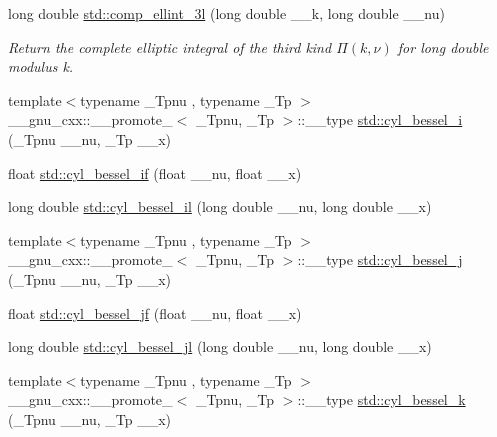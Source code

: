 \begin{DoxyCompactItemize}
long double \hyperlink{group__tr29124__math__spec__func_ga1ca081fee102cd0d4d6b091285e495e5}{std\+::comp\+\_\+ellint\+\_\+3l} (long double \+\_\+\+\_\+k, long double \+\_\+\+\_\+nu)
\begin{DoxyCompactList}\small\item\em Return the complete elliptic integral of the third kind $ \Pi(k,\nu) $ for {\ttfamily long double} modulus {\ttfamily k}. \end{DoxyCompactList}\item 
{\footnotesize template$<$typename \+\_\+\+Tpnu , typename \+\_\+\+Tp $>$ }\\\+\_\+\+\_\+gnu\+\_\+cxx\+::\+\_\+\+\_\+promote\+\_$<$ \+\_\+\+Tpnu, \+\_\+\+Tp $>$\+::\+\_\+\+\_\+type \hyperlink{group__tr29124__math__spec__func_ga1c9b5a5c36f000a4f0a55f7fcc486cb0}{std\+::cyl\+\_\+bessel\+\_\+i} (\+\_\+\+Tpnu \+\_\+\+\_\+nu, \+\_\+\+Tp \+\_\+\+\_\+x)
\item 
float \hyperlink{group__tr29124__math__spec__func_gaaf738427d4da0bda66bc2274dfb853a7}{std\+::cyl\+\_\+bessel\+\_\+if} (float \+\_\+\+\_\+nu, float \+\_\+\+\_\+x)
\item 
long double \hyperlink{group__tr29124__math__spec__func_gab7962629216d03efb8ecaa3f70c6878f}{std\+::cyl\+\_\+bessel\+\_\+il} (long double \+\_\+\+\_\+nu, long double \+\_\+\+\_\+x)
\item 
{\footnotesize template$<$typename \+\_\+\+Tpnu , typename \+\_\+\+Tp $>$ }\\\+\_\+\+\_\+gnu\+\_\+cxx\+::\+\_\+\+\_\+promote\+\_$<$ \+\_\+\+Tpnu, \+\_\+\+Tp $>$\+::\+\_\+\+\_\+type \hyperlink{group__tr29124__math__spec__func_ga47e21a13b6d68d0d7f057699bd3b3ce0}{std\+::cyl\+\_\+bessel\+\_\+j} (\+\_\+\+Tpnu \+\_\+\+\_\+nu, \+\_\+\+Tp \+\_\+\+\_\+x)
\item 
float \hyperlink{group__tr29124__math__spec__func_ga15731a7bccd6351d28353e3c4c2a2d23}{std\+::cyl\+\_\+bessel\+\_\+jf} (float \+\_\+\+\_\+nu, float \+\_\+\+\_\+x)
\item 
long double \hyperlink{group__tr29124__math__spec__func_gade8e94a80520a8b628b2d658755b25c0}{std\+::cyl\+\_\+bessel\+\_\+jl} (long double \+\_\+\+\_\+nu, long double \+\_\+\+\_\+x)
\item 
{\footnotesize template$<$typename \+\_\+\+Tpnu , typename \+\_\+\+Tp $>$ }\\\+\_\+\+\_\+gnu\+\_\+cxx\+::\+\_\+\+\_\+promote\+\_$<$ \+\_\+\+Tpnu, \+\_\+\+Tp $>$\+::\+\_\+\+\_\+type \hyperlink{group__tr29124__math__spec__func_ga76dcd3884620955680112aca0d327ada}{std\+::cyl\+\_\+bessel\+\_\+k} (\+\_\+\+Tpnu \+\_\+\+\_\+nu, \+\_\+\+Tp \+\_\+\+\_\+x)

\end{DoxyCompactItemize}
